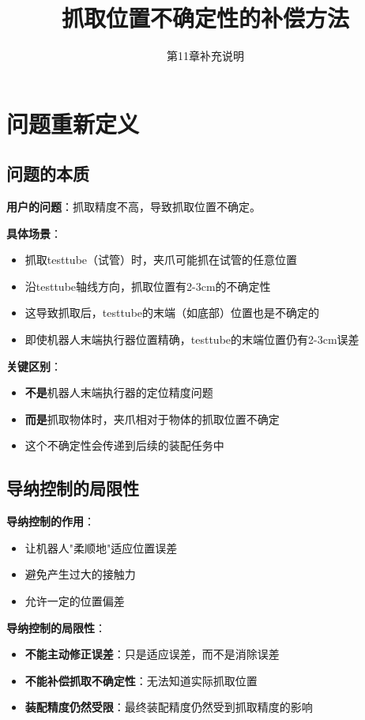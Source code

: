 \documentclass[12pt,a4paper]{article}
\title{抓取位置不确定性的补偿方法}
\author{第11章补充说明}
\date{}
\begin{document}
\maketitle

\section{问题重新定义}

\subsection{问题的本质}

\textbf{用户的问题}：抓取精度不高，导致抓取位置不确定。

\textbf{具体场景}：
\begin{itemize}
\item 抓取testtube（试管）时，夹爪可能抓在试管的任意位置
\item 沿testtube轴线方向，抓取位置有2-3cm的不确定性
\item 这导致抓取后，testtube的末端（如底部）位置也是不确定的
\item 即使机器人末端执行器位置精确，testtube的末端位置仍有2-3cm误差
\end{itemize}

\textbf{关键区别}：
\begin{itemize}
\item \textbf{不是}机器人末端执行器的定位精度问题
\item \textbf{而是}抓取物体时，夹爪相对于物体的抓取位置不确定
\item 这个不确定性会传递到后续的装配任务中
\end{itemize}

\subsection{导纳控制的局限性}

\textbf{导纳控制的作用}：
\begin{itemize}
\item 让机器人"柔顺地"适应位置误差
\item 避免产生过大的接触力
\item 允许一定的位置偏差
\end{itemize}

\textbf{导纳控制的局限性}：
\begin{itemize}
\item \textbf{不能主动修正误差}：只是适应误差，而不是消除误差
\item \textbf{不能补偿抓取不确定性}：无法知道实际抓取位置
\item \textbf{装配精度仍然受限}：最终装配精度仍然受到抓取精度的影响
\end{itemize}
\end{document}
